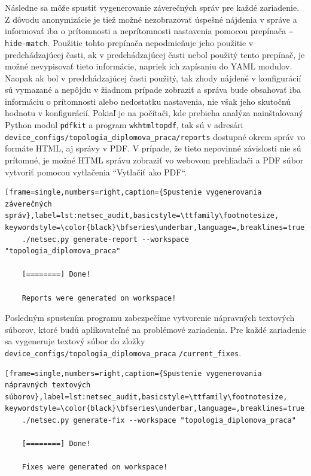 \vspace{2em}
Následne sa môže spustiť vygenerovanie záverečných správ pre každé zariadenie. Z dôvodu anonymizácie je tiež možné nezobrazovať úspešné nájdenia v správe a informovať iba o prítomnosti a neprítomnosti nastavenia pomocou prepínača \texttt{---hide-match}. Použitie tohto prepínača nepodmieňuje jeho použitie v predchádzajúcej časti, ak v predchádzajúcej časti nebol použitý tento prepínač, je možné nevypisovať tieto informácie, napriek ich zapísaniu do YAML modulov. Naopak ak bol v predchádzajúcej časti použitý, tak zhody nájdené v konfigurácií sú vymazané a nepôjdu v žiadnom prípade zobraziť a správa bude obsahovať iba informáciu o prítomnosti alebo nedostatku nastavenia, nie však jeho skutočnú hodnotu v konfigurácií. Pokiaľ je na počítači, kde prebieha analýza nainštalovaný Python modul \texttt{pdfkit} a program \texttt{wkhtmltopdf}, tak sú v adresári \texttt{device\_configs/topologia\_diplomova\_praca/reports} dostupné okrem správ vo formáte HTML, aj správy v PDF. V prípade, že tieto nepovinné závislosti nie sú prítomné, je možné HTML správu zobraziť vo webovom prehliadači a PDF súbor vytvoriť pomocou vytlačenia ``Vytlačiť ako PDF``.

\begin{minipage}{\linewidth}		
	\begin{lstlisting}[frame=single,numbers=right,caption={Spustenie vygenerovania záverečných správ},label=lst:netsec_audit,basicstyle=\ttfamily\footnotesize, keywordstyle=\color{black}\bfseries\underbar,language=,breaklines=true]
	./netsec.py generate-report --workspace "topologia_diplomova_praca"
	
	[========] Done!
	
	Reports were generated on workspace!
	\end{lstlisting}
\end{minipage}
\newpage
\vspace{2em}
Posledným spustením programu zabezpečíme vytvorenie nápravných textových súborov, ktoré budú aplikovateľné na problémové zariadenia. Pre každé zariadenie sa vygeneruje textový súbor do zložky \texttt{device\_configs/topologia\_diplomova\_praca} \texttt{/current\_fixes}.

\begin{minipage}{\linewidth}		
	\begin{lstlisting}[frame=single,numbers=right,caption={Spustenie vygenerovania nápravných textových súborov},label=lst:netsec_audit,basicstyle=\ttfamily\footnotesize, keywordstyle=\color{black}\bfseries\underbar,language=,breaklines=true]
	./netsec.py generate-fix --workspace "topologia_diplomova_praca"
	
	[========] Done!
	
	Fixes were generated on workspace!
	\end{lstlisting}
\end{minipage}


